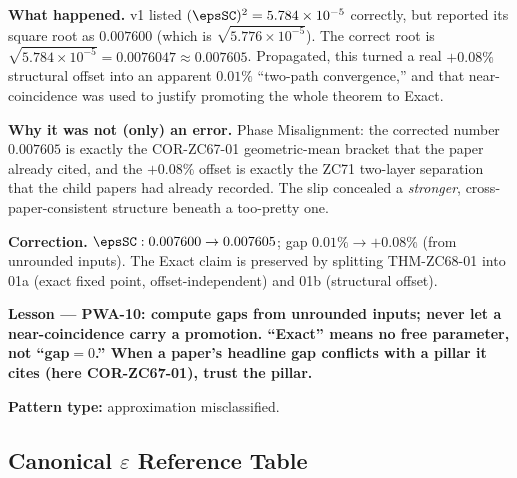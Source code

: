 \documentclass[12pt, a4paper]{article}
\begin{document}
\begin{derivedbox}[title={PM-ZC68-SQRT-01: Square-Root Slip and
  Over-Tight Gift Framing (Failure Stance) --- new in v2}]

\textbf{What happened.}
v1 listed $(\epsSC)^2=5.784\times10^{-5}$ correctly, but reported its
square root as $0.007600$ (which is $\sqrt{5.776\times10^{-5}}$). The
correct root is $\sqrt{5.784\times10^{-5}}=0.0076047\approx0.007605$.
Propagated, this turned a real $+0.08\%$ structural offset into an
apparent $0.01\%$ ``two-path convergence,'' and that near-coincidence
was used to justify promoting the whole theorem to Exact.

\textbf{Why it was not (only) an error.}
Phase Misalignment: the corrected number $0.007605$ is exactly the
COR-ZC67-01 geometric-mean bracket that the paper already cited, and the
$+0.08\%$ offset is exactly the ZC71 two-layer separation that the child
papers had already recorded. The slip concealed a \emph{stronger},
cross-paper-consistent structure beneath a too-pretty one.

\textbf{Correction.}
$\epsSC: 0.007600\to0.007605$; gap $0.01\%\to+0.08\%$ (from unrounded
inputs). The Exact claim is preserved by splitting THM-ZC68-01 into
01a (exact fixed point, offset-independent) and 01b (structural offset).

\textbf{Lesson --- PWA-10: compute gaps from unrounded inputs; never let
a near-coincidence carry a promotion. ``Exact'' means no free parameter,
not ``gap${=}0$.'' When a paper's headline gap conflicts with a pillar it
cites (here COR-ZC67-01), trust the pillar.}

\textbf{Pattern type:} approximation misclassified.
\end{derivedbox}

\subsection{Canonical $\varepsilon$ Reference Table}
\label{sec:eps-table}
\end{document}
